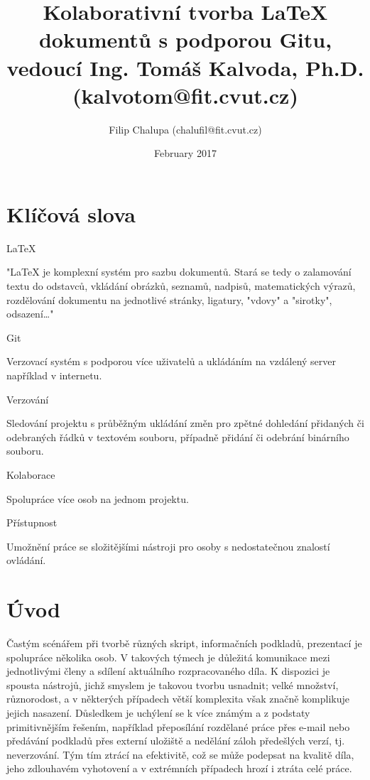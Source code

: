\documentclass{article}
\title{Kolaborativní tvorba LaTeX dokumentů s podporou Gitu, vedoucí Ing. Tomáš Kalvoda, Ph.D. (kalvotom@fit.cvut.cz)}
\author{Filip Chalupa (chalufil@fit.cvut.cz)}
\date{February 2017}
\begin{document}
\maketitle

\section{Klíčová slova}
LaTeX

"LaTeX je komplexní systém pro sazbu dokumentů. Stará se tedy o zalamování textu do odstavců, vkládání obrázků, seznamů, nadpisů, matematických výrazů, rozdělování dokumentu na jednotlivé stránky, ligatury, "vdovy" a "sirotky", odsazení\ldots" \citep{cit1}

Git

Verzovací systém s podporou více uživatelů a ukládáním na vzdálený server například v internetu.

Verzování

Sledování projektu s průběžným ukládání změn pro zpětné dohledání přidaných či odebraných řádků v textovém souboru, případně přidání či odebrání binárního souboru.

Kolaborace

Spolupráce více osob na jednom projektu.

Přístupnost

Umožnění práce se složitějšími nástroji pro osoby s nedostatečnou znalostí ovládání.

\section{Úvod}

Častým scénářem při tvorbě různých skript, informačních podkladů, prezentací je spolupráce několika osob. V takových týmech je důležitá komunikace mezi jednotlivými členy a sdílení aktuálního rozpracovaného díla. K dispozici je spousta nástrojů, jichž smyslem je takovou tvorbu usnadnit; velké množství, různorodost, a v některých případech větší komplexita však značně komplikuje jejich nasazení. Důsledkem je uchýlení se k více známým a z podstaty primitivnějším řešením, například přeposílání rozdělané práce přes e-mail nebo předávání podkladů přes externí uložiště a nedělání záloh předešlých verzí, tj. neverzování. Tým tím ztrácí na efektivitě, což se může podepsat na kvalitě díla, jeho zdlouhavém vyhotovení a v extrémních případech hrozí i ztráta celé práce.
\end{document}
